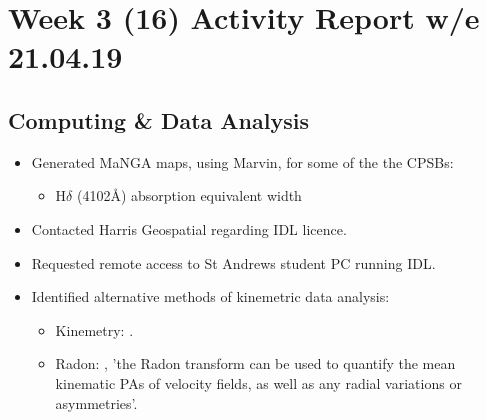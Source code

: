 \section{Week 3 (16) Activity Report w/e 21.04.19}
\subsection{Computing \& Data Analysis}
\begin{itemize}
    \item Generated MaNGA maps, using Marvin, for some of the the CPSBs: 
    \begin{itemize}
        \item H$\delta$ (4102\AA) absorption equivalent width
    \end{itemize}
    \item Contacted Harris Geospatial regarding IDL licence.
    \item Requested remote access to St Andrews student PC running IDL. 
    \item Identified alternative methods of kinemetric data analysis:
    \begin{itemize}
        \item Kinemetry: \citep{2006MNRAS.366..787K}.
        \item Radon: \citep{2018MNRAS.480.2217S}, 'the Radon transform can be used to quantify the mean kinematic PAs of velocity fields, as well as any radial variations or asymmetries'. 
    \end{itemize}
\end{itemize}

